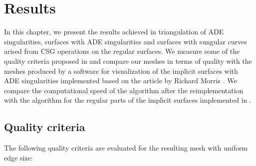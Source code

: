 \chapter{Results}
\label{chap4}

In this chapter, we present the results achieved in triangulation of
ADE singularities, surfaces with ADE singularities and surfaces with 
sungular curves arised from CSG operations on the regular surfaces.
We measure some of the quality criteria proposed in \cite{korecova2021triangulation}
and compare our meshes in terms of quality with the meshes produced by a software 
for visualization of the implicit surfaces with ADE singularities implemented
based on the article by Richard Morris \cite{morris2003client}.
We compare the computational speed of the algorithm after the reimplementation
with the algorithm for the regular parts of the implicit surfaces 
implemented in \cite{korecova2021triangulation}.

\section{Quality criteria}
\label{sub4.1}

The following quality criteria \cite{korecova2021triangulation} are evaluated 
for the resulting mesh with uniform edge size:

